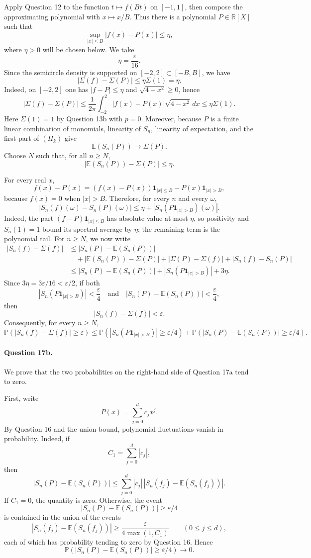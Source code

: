 \documentclass[11pt,a4paper]{article}
\newcommand{\R}{\mathbb{R}}
\newcommand{\E}{\mathbb{E}}
\newcommand{\Prob}{\mathbb{P}}
\newcommand{\one}{\mathbf{1}}
\begin{document}
Apply Question 12 to the function $t\mapsto f(Bt)$ on $[-1,1]$, then compose the approximating polynomial with $x\mapsto x/B$.  Thus there is a polynomial $P\in\R[X]$ such that
\[
  \sup_{|x|\le B}|f(x)-P(x)|\le \eta,
\]
where $\eta>0$ will be chosen below.  We take
\[
  \eta=\frac\varepsilon{16}.
\]
Since the semicircle density is supported on $[-2,2]\subset[-B,B]$, we have
\[
  |\Sigma(f)-\Sigma(P)|\le \eta\Sigma(1)=\eta.
\]
Indeed, on $[-2,2]$ one has $|f-P|\le\eta$ and
$\sqrt{4-x^2}\ge0$, hence
\[
  |\Sigma(f)-\Sigma(P)|
  \le \frac1{2\pi}\int_{-2}^2 |f(x)-P(x)|\sqrt{4-x^2}\,dx
  \le \eta\Sigma(1).
\]
Here $\Sigma(1)=1$ by Question 13b with $p=0$.  Moreover, because $P$ is a
finite linear combination of monomials, linearity of $S_n$, linearity of
expectation, and the first part of $(H_k)$ give
\[
  \E(S_n(P))\longrightarrow \Sigma(P).
\]
Choose $N$ such that, for all $n\ge N$,
\[
  |\E(S_n(P))-\Sigma(P)|\le\eta.
\]

For every real $x$,
\[
  f(x)-P(x)
  =(f(x)-P(x))\one_{|x|\le B}-P(x)\one_{|x|>B},
\]
because $f(x)=0$ when $|x|>B$.  Therefore, for every $n$ and every $\omega$,
\[
  |S_n(f)(\omega)-S_n(P)(\omega)|
  \le \eta+|S_n(P\one_{|x|>B})(\omega)|.
\]
Indeed, the part $(f-P)\one_{|x|\le B}$ has absolute value at most $\eta$,
so positivity and $S_n(1)=1$ bound its spectral average by $\eta$; the
remaining term is the polynomial tail.
For $n\ge N$, we now write
\[
\begin{aligned}
 |S_n(f)-\Sigma(f)|
 &\le |S_n(P)-\E(S_n(P))|\\
 &\quad +|\E(S_n(P))-\Sigma(P)|
       +|\Sigma(P)-\Sigma(f)|
       +|S_n(f)-S_n(P)|\\
 &\le |S_n(P)-\E(S_n(P))|
       +|S_n(P\one_{|x|>B})|+3\eta.
\end{aligned}
\]
Since $3\eta=3\varepsilon/16<\varepsilon/2$, if both
\[
  |S_n(P\one_{|x|>B})|<\frac\varepsilon4
  \quad\text{and}\quad
  |S_n(P)-\E(S_n(P))|<\frac\varepsilon4,
\]
then
\[
  |S_n(f)-\Sigma(f)|<\varepsilon.
\]
Consequently, for every $n\ge N$,
\[
  \boxed{
  \Prob(|S_n(f)-\Sigma(f)|\ge\varepsilon)
  \le
  \Prob(|S_n(P\one_{|x|>B})|\ge\varepsilon/4)
  +
  \Prob(|S_n(P)-\E(S_n(P))|\ge\varepsilon/4).}
\]

\paragraph{Question 17b.}
We prove that the two probabilities on the right-hand side of Question 17a tend to zero.

First, write
\[
  P(x)=\sum_{j=0}^d c_jx^j.
\]
By Question 16 and the union bound, polynomial fluctuations vanish in probability.  Indeed, if
\[
  C_1=\sum_{j=0}^d |c_j|,
\]
then
\[
  |S_n(P)-\E(S_n(P))|
  \le\sum_{j=0}^d |c_j|\,|S_n(f_j)-\E(S_n(f_j))|.
\]
If $C_1=0$, the quantity is zero.  Otherwise, the event
\[
  |S_n(P)-\E(S_n(P))|\ge\varepsilon/4
\]
is contained in the union of the events
\[
  |S_n(f_j)-\E(S_n(f_j))|\ge\frac{\varepsilon}{4\max(1,C_1)}
  \qquad(0\le j\le d),
\]
each of which has probability tending to zero by Question 16.  Hence
\[
  \Prob(|S_n(P)-\E(S_n(P))|\ge\varepsilon/4)\longrightarrow0.
\]
\end{document}
